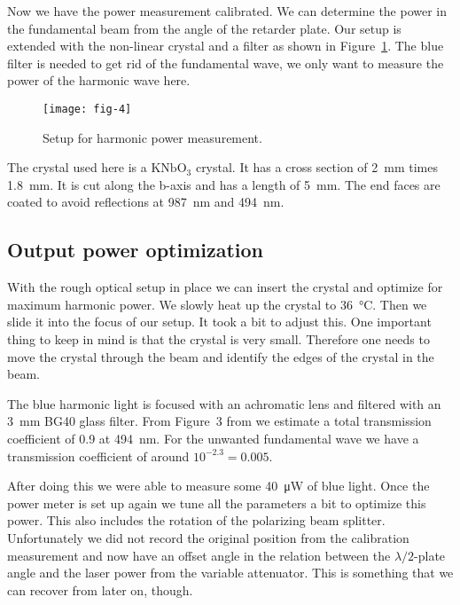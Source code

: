 \documentclass[11pt, english, fleqn, DIV=15, headinclude, BCOR=2cm]{scrreprt}
\begin{document}
Now we have the power measurement calibrated. We can determine the power in the
fundamental beam from the angle of the retarder plate. Our setup is extended
with the non-linear crystal and a filter as shown in Figure~\ref{fig:fig-4}.
The blue filter is needed to get rid of the fundamental wave, we only want to
measure the power of the harmonic wave here.

\begin{figure}
    \centering
    \texttt{[image: fig-4]}
    \caption{%
        Setup for harmonic power measurement.
        \parencite[Figure~4]{lab-course/doubling/manual}
    }
    \label{fig:fig-4}
\end{figure}

The crystal used here is a $\mathrm{KNbO_3}$ crystal. It has a cross section of
\SI{2}{\milli\meter} times \SI{1.8}{\milli\meter}. It is cut along the b-axis
and has a length of \SI{5}{\milli\meter}. The end faces are coated to avoid
reflections at \SI{987}{\nano\meter} and \SI{494}{\nano\meter}.
\parencite[6]{lab-course/doubling/manual}

\subsection{Output power optimization}

With the rough optical setup in place we can insert the crystal and optimize
for maximum harmonic power. We slowly heat up the crystal to \SI{36}{\celsius}.
Then we slide it into the focus of our setup. It took a bit to adjust this. One
important thing to keep in mind is that the crystal is very small. Therefore
one needs to move the crystal through the beam and identify the edges of the
crystal in the beam.

The blue harmonic light is focused with an achromatic lens and filtered with an
\SI{3}{\milli\meter} BG40 glass filter. From Figure~3 from
\parencite{lab-course/doubling/manual} we estimate a total transmission
coefficient of \num{0.9} at \SI{494}{\nano\meter}. For the unwanted fundamental
wave we have a transmission coefficient of around $10^{-2.3} = 0.005$.

After doing this we were able to measure some \SI{40}{\micro\watt} of blue
light. Once the power meter is set up again we tune all the parameters a bit to
optimize this power. This also includes the rotation of the polarizing beam
splitter. Unfortunately we did not record the original position from the
calibration measurement and now have an offset angle in the relation between
the $\lambda/2$-plate angle and the laser power from the variable attenuator.
This is something that we can recover from later on, though.
\end{document}
